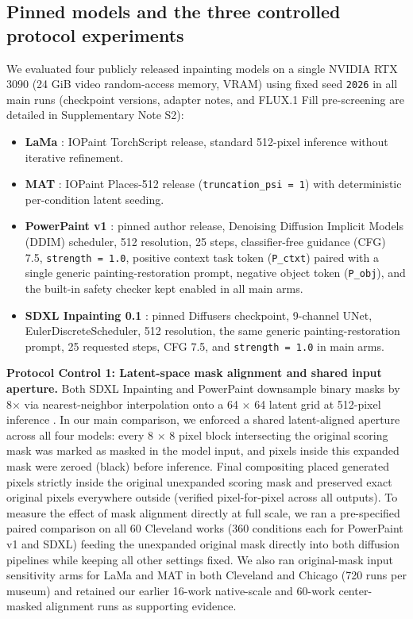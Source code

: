 \documentclass[applsci,article,submit,pdftex,moreauthors]{Definitions/mdpi}
\providecommand{\tightlist}{\setlength{\itemsep}{0pt}\setlength{\parskip}{0pt}}
\begin{document}
\subsection{Pinned models and the three controlled protocol experiments}\label{pinned-models-and-the-three-controlled-protocol-experiments}

We evaluated four publicly released inpainting models on a single NVIDIA RTX 3090 (24 GiB video random-access memory, VRAM) using fixed seed \texttt{2026} in all main runs (checkpoint versions, adapter notes, and FLUX.1 Fill \citep{fluxfill} pre-screening are detailed in Supplementary Note S2):

\begin{itemize}
\tightlist
\item
  \textbf{LaMa} \citep{suvorov2021}: IOPaint TorchScript release, standard 512-pixel inference without iterative refinement.
\item
  \textbf{MAT} \citep{li2022mat}: IOPaint Places-512 release (\texttt{truncation\_psi\ =\ 1}) with deterministic per-condition latent seeding.
\item
  \textbf{PowerPaint v1} \citep{zhuang2023}: pinned author release, Denoising Diffusion Implicit Models (DDIM) scheduler, 512 resolution, 25 steps, classifier-free guidance (CFG) 7.5, \texttt{strength\ =\ 1.0}, positive context task token (\texttt{P\_ctxt}) paired with a single generic painting-restoration prompt, negative object token (\texttt{P\_obj}), and the built-in safety checker kept enabled in all main arms.
\item
  \textbf{SDXL Inpainting 0.1} \citep{sdxlinpaint}: pinned Diffusers checkpoint, 9-channel UNet, EulerDiscreteScheduler, 512 resolution, the same generic painting-restoration prompt, 25 requested steps, CFG 7.5, and \texttt{strength\ =\ 1.0} in main arms.
\end{itemize}

\textbf{Protocol Control 1: Latent-space mask alignment and shared input aperture.} Both SDXL Inpainting and PowerPaint downsample binary masks by 8\ensuremath{\times} via nearest-neighbor interpolation onto a 64 \ensuremath{\times} 64 latent grid at 512-pixel inference \citep{diffuserssdxl0352, powerpaintv1src}. In our main comparison, we enforced a shared latent-aligned aperture across all four models: every 8 \ensuremath{\times} 8 pixel block intersecting the original scoring mask was marked as masked in the model input, and pixels inside this expanded mask were zeroed (black) before inference. Final compositing placed generated pixels strictly inside the original unexpanded scoring mask and preserved exact original pixels everywhere outside (verified pixel-for-pixel across all outputs). To measure the effect of mask alignment directly at full scale, we ran a pre-specified paired comparison on all 60 Cleveland works (360 conditions each for PowerPaint v1 and SDXL) feeding the unexpanded original mask directly into both diffusion pipelines while keeping all other settings fixed. We also ran original-mask input sensitivity arms for LaMa and MAT in both Cleveland and Chicago (720 runs per museum) and retained our earlier 16-work native-scale and 60-work center-masked alignment runs as supporting evidence.
\end{document}
